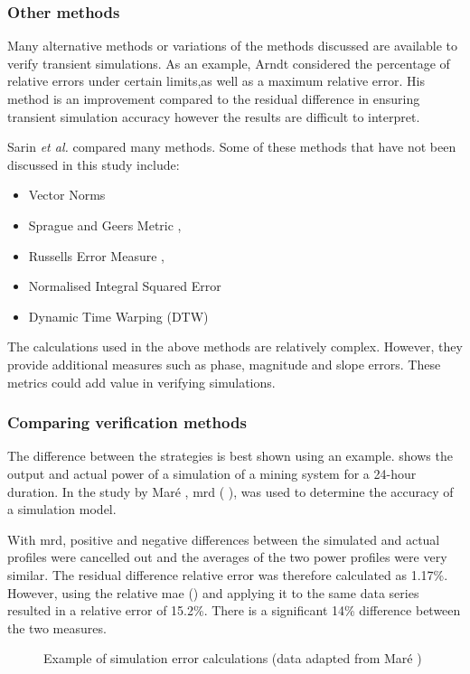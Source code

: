  		\subsubsection{Other methods}
 		Many alternative methods or variations of the methods discussed are available to verify transient simulations. As an example, Arndt \cite{arndt2007integrated} considered the percentage of relative errors under certain limits,as well as a maximum relative error. His method is an improvement compared to the residual difference in ensuring transient simulation accuracy however the results are difficult to interpret.
 		\par
 		Sarin \textit{et al.} \cite{sarin2010comparing} compared many methods. Some of these methods that have not been discussed in this study include:
 		\begin{itemize}
 			\item Vector Norms
 			\item Sprague and Geers Metric \cite{Geers1984Objective}, \cite{Sprague2004Spectral}
 			\item Russells Error Measure \cite{Russell1}, \cite{Russell2}
 			\item Normalised Integral Squared Error
 			\item Dynamic Time Warping (DTW)
 		\end{itemize}
 		The calculations used in the above methods are relatively complex. However, they provide additional measures such as phase, magnitude and slope errors. These metrics could add value in verifying simulations.
 		\subsubsection{Comparing verification methods}
 		The difference between the strategies is best shown using an example.  shows the output and actual power of a simulation of a mining system for a 24-hour duration. In the study by Maré \cite{Mare2016PhD}, \gls{mrd} ( ), was used to determine the accuracy of a simulation model.
 		\par 
 		 With \gls{mrd}, positive and negative differences between the simulated and actual profiles were cancelled out and the averages of the two power profiles were very similar. The residual difference relative error was therefore calculated as 1.17\%. However, using the relative \gls{mae} ()  and applying it to the same data series resulted in a relative error of 15.2\%. There is a significant 14\% difference between the two measures. 
 		  \par
		 \clearpage
 	\begin{figure}[!htbp]
 		\centering
 		
 		\caption[Example of simulation error calculations]{Example of simulation error calculations (data adapted from Maré \cite{Mare2016PhD})}
 		\label{fig:Philipp Difference verify}
 	\end{figure}

